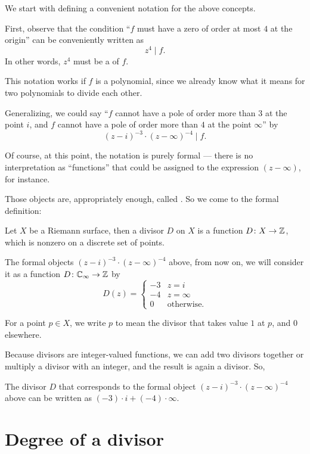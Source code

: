 We start with defining a convenient notation for the above concepts.

First, observe that the condition ``$f$ must have a zero of order at most $4$ at the origin'' can be
conveniently written as
\[ z^4 \mid f.  \]
In other words, $z^4$ must be a  of $f$.

This notation works if $f$ is a polynomial, since we already know what it means for two polynomials
to divide each other.

Generalizing, we could say ``$f$ cannot have a pole of order more than $3$ at the point $i$,
and $f$ cannot have a pole of order more than $4$ at the point $\infty$'' by
\[ (z-i)^{-3} \cdot (z-\infty)^{-4} \mid f.  \]

Of course, at this point, the notation is purely formal --- there is no interpretation as
``functions'' that could be assigned to the expression $(z-\infty)$, for instance.

Those objects are, appropriately enough, called . So we come to the formal
definition:
\begin{definition}[Divisors]
	Let $X$ be a Riemann surface, then a divisor $D$ on $X$ is a function $D \colon X \to \mathbb Z$,
	which is nonzero on a discrete set of points.
\end{definition}

The formal objects $(z-i)^{-3} \cdot (z-\infty)^{-4}$ above, from now on, we will consider it as a
function $D \colon \mathbb C_\infty \to \mathbb Z$ by
\[ D(z) = \begin{cases} -3 & z = i \\ -4 & z = \infty \\ 0 & \text{otherwise}. \end{cases} \]

\begin{abuse}
	For a point $p \in X$, we write $p$ to mean the divisor that takes value $1$ at $p$, and $0$
	elsewhere.
\end{abuse}

Because divisors are integer-valued functions, we can add two divisors together or multiply a
divisor with an integer, and the result is again a divisor. So,
\begin{example}
	The divisor $D$ that corresponds to the formal object $(z-i)^{-3} \cdot (z-\infty)^{-4}$ above
	can be written as $(-3) \cdot i + (-4) \cdot \infty$.
\end{example}

\section{Degree of a divisor}

